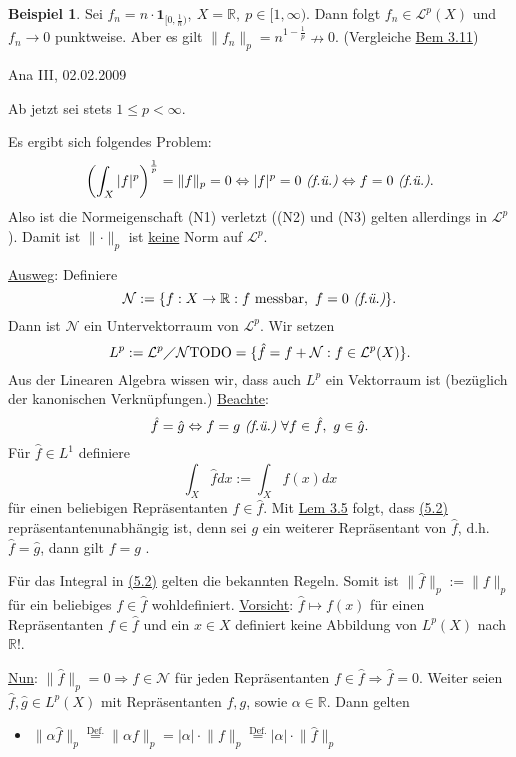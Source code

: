 \documentclass[a4paper]{scrreprt}
\newcommand{\doubleOne}{\textbf{1}}
\newcommand{\R}{\mathbb{R}}
\newcommand{\Leb}{\mathcal{L}}
\newcommand{\jlabel}[1]{\label{j_#1}}
\newcommand{\jhyperref}[2]{\hyperref[j_#1]{#2}}
\newcommand{\jlink}[1]{\jhyperref{#1}{#1}}
\newcommand{\fu}{\text{\textit{(f.ü.)}}}
\newcommand{\jabb}[3]{ #1: #2 \rightarrow #3 }
\newcommand{\jspace}{\vspace{8pt}}
\newcommand{\jspacesmall}{\vspace{4pt}}
\newcommand{\jdate}[1]{\jspacesmall\begin{center}\jlabel{#1}\tiny{Ana III, #1}\end{center}}
\theoremstyle{plain}
\theoremstyle{definition}
\newtheorem*{expl*}{Beispiel}
\begin{document}
{{{{\begin{expl*}
    Sei $f_n = n\cdot \doubleOne_{[0,\frac{1}{n})},\ X=\R,\ p\in [1,\infty)$. Dann folgt $f_n \in \Leb^p(X)$ und $f_n \to 0$ punktweise. Aber es gilt $\lVert f_n \rVert_p = n^{1-\frac{1}{p}} \nrightarrow 0.$ (Vergleiche \jlink{Bem 3.11})
\end{expl*}


\jdate{02.02.2009}


Ab jetzt sei stets $1\le p < \infty$.

\jspace
Es ergibt sich folgendes Problem:
\[
    \left(\int_X |f|^p \right)^\frac{1}{p} = \lVert f \rVert_p = 0 \Leftrightarrow |f|^p=0\ \fu \Leftrightarrow f = 0\ \fu.
\]
Also ist die Normeigenschaft (N1) verletzt ((N2) und (N3) gelten allerdings in $\Leb^p$). Damit ist $\lVert \cdot \rVert_p$ ist \uline{keine} Norm auf $\Leb^p$.

\jspace

\uline{Ausweg}: Definiere
\[
    \mathcal{N} := \{\jabb{f}{X}{\R}: f \text{ messbar},\ f=0 \ \fu\}.
\]
Dann ist $\mathcal{N}$ ein Untervektorraum von $\Leb^p$. Wir setzen
\begin{equation}
    \jlabel{(5.1)}
    L^p:= \Leb^p \diagup \mathcal{N} \text{TODO} = \{\hat{f} = f + \mathcal{N} : f \in \Leb^p(X) \}.
\end{equation}
Aus der Linearen Algebra wissen wir, dass auch $L^p$ ein Vektorraum ist (bezüglich der kanonischen Verknüpfungen.)
\jspacesmall
\uline{Beachte}:
\[
    \hat{f} = \hat{g} \Leftrightarrow f=g\ \fu\ \forall f\in\hat{f},\ g\in\hat{g}.
\]
Für $\hat{f}\in L^1$ definiere
\begin{equation}
    \jlabel{(5.2)}
    \int_X \hat{f} dx := \int_X f(x) dx
\end{equation}
für einen beliebigen Repräsentanten $f\in \hat{f}$. Mit \jlink{Lem 3.5} folgt, dass \jlink{(5.2)} repräsentantenunabhängig ist, denn sei $g$ ein weiterer Repräsentant von $\hat{f}$, d.h. $\hat{f} = \hat{g}$, dann gilt $f=g$ \fu.

\jspace

Für das Integral in \jlink{(5.2)} gelten die bekannten Regeln. Somit ist $\lVert \hat{f} \rVert_p := \lVert f \rVert_p$ für ein beliebiges $f \in \hat{f}$ wohldefiniert.
\jspacesmall
\uline{Vorsicht}: $\hat{f} \mapsto f(x)$ für einen Repräsentanten $f\in \hat{f}$ und ein $x\in X$ definiert keine Abbildung von $L^p(X)$ nach $\R$!.

\jspace

 \uline{Nun}: $\lVert \hat{f} \rVert_p = 0 \Rightarrow f \in \mathcal{N}$ für jeden Repräsentanten $f\in \hat{f} \Rightarrow \hat{f} =0$. Weiter seien $\hat{f}, \hat{g} \in L^p(X)$ mit Repräsentanten $f,g$, sowie $\alpha \in \R$. Dann gelten
\begin{itemize}
    \item $\lVert \alpha \hat{f}\rVert_p \overset{\text{Def.}}{=} \lVert \alpha f \rVert_p = |\alpha|\cdot \lVert f \rVert_p \overset{\text{Def.}}{=} |\alpha|\cdot \lVert \hat{f} \rVert_p$


\end{itemize}}}}}
\end{document}
